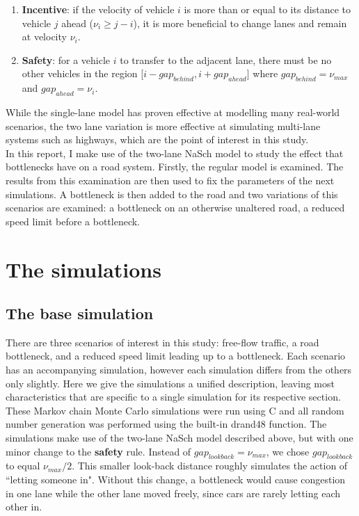 \documentclass[11pt]{article}
\begin{document}
	\begin{enumerate}
		\item \textbf{Incentive}: if the velocity of vehicle $i$ is more than or equal to its distance to vehicle $j$ ahead ($\nu_i \geq j-i$), it is more beneficial to change lanes and remain at velocity $\nu_i$.
		\item \textbf{Safety}: for a vehicle $i$ to transfer to the adjacent lane, there must be no other vehicles in the region [$i-gap_{behind}, i+gap_{ahead}]$ where $gap_{behind} = \nu_{max}$ and $gap_{ahead} = \nu_i$.
	\end{enumerate}
	
	While the single-lane model has proven effective at modelling many real-world scenarios, the two lane variation is more effective at simulating multi-lane systems such as highways, which are the point of interest in this study.\\ 
	
	In this report, I make use of the two-lane NaSch model to study the effect that bottlenecks have on a road system. Firstly, the regular model is examined. The results from this examination are then used to fix the parameters of the next simulations. A bottleneck is then added to the road and two variations of this scenarios are examined: a bottleneck on an otherwise unaltered road, a reduced speed limit before a bottleneck.
	
	\section{The simulations}\label{sec:sims}
	
	\subsection{The base simulation}\label{subsec:basesim}
	
	There are three scenarios of interest in this study: free-flow traffic, a road bottleneck, and a reduced speed limit leading up to a bottleneck. Each scenario has an accompanying simulation, however each simulation differs from the others only slightly. Here we give the simulations a unified description, leaving most characteristics that are specific to a single simulation for its respective section.\\
	
	These Markov chain Monte Carlo simulations were run using C and all random number generation was performed using the built-in drand48 function. The simulations make use of the two-lane NaSch model described above, but with one minor change to the \textbf{safety} rule. Instead of $gap_{lookback} = \nu_{max}$, we chose $gap_{lookback}$ to equal $\nu_{max}/2$. This smaller look-back distance roughly simulates the action of ``letting someone in". Without this change, a bottleneck would cause congestion in one lane while the other lane moved freely, since cars are rarely letting each other in. \\
	
\end{document}
